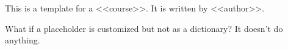 
This is a template for a <<course>>. It is
written by <<author>>.

\iffalse
course:
    name: blob
    type: input
    validate: "lambda v: len(v) != 0"
    when: "lambda d: 'name' not in d"
\fi


What if a placeholder is customized but not as a dictionary?
It doesn't do anything.

\iffalse
author: E.A.P.
\fi
